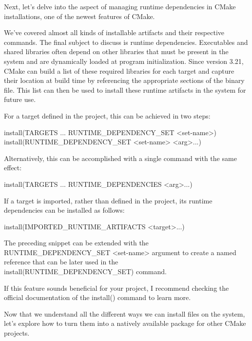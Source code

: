 Next, let’s delve into the aspect of managing runtime dependencies in CMake installations, one of the newest features of CMake.


We’ve covered almost all kinds of installable artifacts and their respective commands. The final subject to discuss is runtime dependencies. Executables and shared libraries often depend on other libraries that must be present in the system and are dynamically loaded at program initialization. Since version 3.21, CMake can build a list of these required libraries for each target and capture their location at build time by referencing the appropriate sections of the binary file. This list can then be used to install these runtime artifacts in the system for future use.

For a target defined in the project, this can be achieved in two steps:

\begin{shell}
install(TARGETS ... RUNTIME_DEPENDENCY_SET <set-name>)
install(RUNTIME_DEPENDENCY_SET <set-name> <arg>...)
\end{shell}

Alternatively, this can be accomplished with a single command with the same effect:

\begin{shell}
install(TARGETS ... RUNTIME_DEPENDENCIES <arg>...)
\end{shell}

If a target is imported, rather than defined in the project, its runtime dependencies can be installed as follows:

\begin{shell}
install(IMPORTED_RUNTIME_ARTIFACTS <target>...)
\end{shell}

The preceding snippet can be extended with the RUNTIME\_DEPENDENCY\_SET <set-name> argument to create a named reference that can be later used in the install(RUNTIME\_DEPENDENCY\_SET) command.

If this feature sounds beneficial for your project, I recommend checking the official documentation of the install() command to learn more.

Now that we understand all the different ways we can install files on the system, let’s explore how to turn them into a natively available package for other CMake projects.










